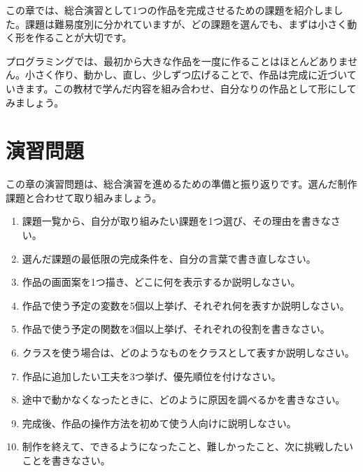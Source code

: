 この章では、総合演習として1つの作品を完成させるための課題を紹介しました。課題は難易度別に分かれていますが、どの課題を選んでも、まずは小さく動く形を作ることが大切です。

プログラミングでは、最初から大きな作品を一度に作ることはほとんどありません。小さく作り、動かし、直し、少しずつ広げることで、作品は完成に近づいていきます。この教材で学んだ内容を組み合わせ、自分なりの作品として形にしてみましょう。

\section{演習問題}

この章の演習問題は、総合演習を進めるための準備と振り返りです。選んだ制作課題と合わせて取り組みましょう。

\begin{enumerate}
    \item 課題一覧から、自分が取り組みたい課題を1つ選び、その理由を書きなさい。
    \item 選んだ課題の最低限の完成条件を、自分の言葉で書き直しなさい。
    \item 作品の画面案を1つ描き、どこに何を表示するか説明しなさい。
    \item 作品で使う予定の変数を5個以上挙げ、それぞれ何を表すか説明しなさい。
    \item 作品で使う予定の関数を3個以上挙げ、それぞれの役割を書きなさい。
    \item クラスを使う場合は、どのようなものをクラスとして表すか説明しなさい。
    \item 作品に追加したい工夫を3つ挙げ、優先順位を付けなさい。
    \item 途中で動かなくなったときに、どのように原因を調べるかを書きなさい。
    \item 完成後、作品の操作方法を初めて使う人向けに説明しなさい。
    \item 制作を終えて、できるようになったこと、難しかったこと、次に挑戦したいことを書きなさい。
\end{enumerate}
